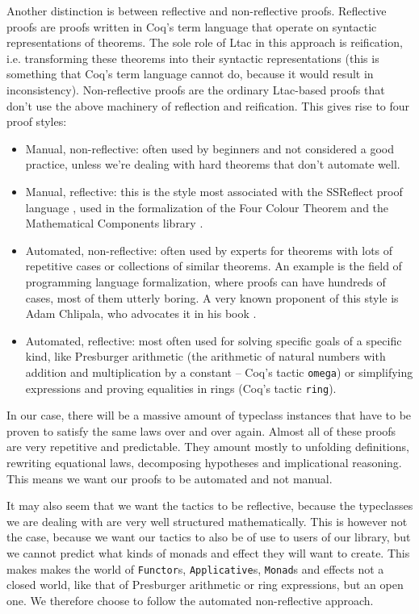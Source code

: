 \documentclass[declaration,inz,english,shortabstract]{iithesis}
\newcommand{\m}[1]{\texttt{#1}}
\begin{document}
Another distinction is between reflective and non-reflective proofs. Reflective proofs are proofs written in Coq's term language that operate on syntactic representations of theorems. The sole role of Ltac in this approach is reification, i.e. transforming these theorems into their syntactic representations (this is something that Coq's term language cannot do, because it would result in inconsistency). Non-reflective proofs are the ordinary Ltac-based proofs that don't use the above machinery of reflection and reification. This gives rise to four proof styles:

\begin{itemize}
    \item Manual, non-reflective: often used by beginners and not considered a good practice, unless we're dealing with hard theorems that don't automate well.
    \item Manual, reflective: this is the style most associated with the SSReflect proof language \cite{SSReflect1} \cite{SSReflect2}, used in the formalization of the Four Colour Theorem \cite{FourColour1} \cite{FourColour2} and the Mathematical Components library \cite{MCB}.
    \item Automated, non-reflective: often used by experts for theorems with lots of repetitive cases or collections of similar theorems. An example is the field of programming language formalization, where proofs can have hundreds of cases, most of them utterly boring. A very known proponent of this style is Adam Chlipala, who advocates it in his book \cite{CPDT}.
    \item Automated, reflective: most often used for solving specific goals of a specific kind, like Presburger arithmetic (the arithmetic of natural numbers with addition and multiplication by a constant -- Coq's tactic \m{omega}) or simplifying expressions and proving equalities in rings (Coq's tactic \m{ring}).
\end{itemize}

In our case, there will be a massive amount of typeclass instances that have to be proven to satisfy the same laws over and over again. Almost all of these proofs are very repetitive and predictable. They amount mostly to unfolding definitions, rewriting equational laws, decomposing hypotheses and implicational reasoning. This means we want our proofs to be automated and not manual.

It may also seem that we want the tactics to be reflective, because the typeclasses we are dealing with are very well structured mathematically. This is however not the case, because we want our tactics to also be of use to users of our library, but we cannot predict what kinds of monads and effect they will want to create. This makes makes the world of \m{Functor}s, \m{Applicative}s, \m{Monad}s and effects not a closed world, like that of Presburger arithmetic or ring expressions, but an open one. We therefore choose to follow the automated non-reflective approach.
\end{document}
